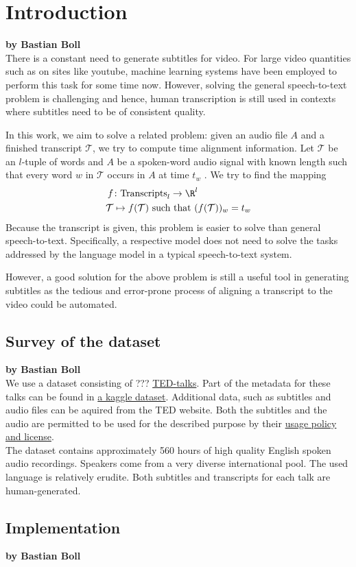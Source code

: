 \chapter{Introduction}
\label{chap:intro}

\textbf{by Bastian Boll} \\

There is a constant need to generate subtitles for video. For large video quantities such as on sites like youtube, machine learning systems have been employed to perform this task for some time now. However, solving the general speech-to-text problem is challenging and hence, human transcription is still used in contexts where subtitles need to be of consistent quality.

In this work, we aim to solve a related problem: given an audio file $A$ and a finished transcript $\mathcal{T}$, we try to compute time alignment information. Let $\mathcal{T}$ be an $l$-tuple of words and $A$ be a spoken-word audio signal with known length such that every word $w$ in $\mathcal{T}$ occurs in $A$ at time $t_w$ . We try to find the mapping
\begin{align*}
	f&\colon\textrm{Transcripts}_l\to\R^l\\
	\mathcal{T}&\mapsto f(\mathcal{T})\textrm{ such that }(f(\mathcal{T}))_w=t_w
\end{align*}
Because the transcript is given, this problem is easier to solve than general speech-to-text. Specifically, a respective model does not need to solve the tasks addressed by the language model in a typical speech-to-text system.

However, a good solution for the above problem is still a useful tool in generating subtitles as the tedious and error-prone process of aligning a transcript to the video could be automated.

\section{Survey of the dataset}

\textbf{by Bastian Boll} \\

We use a dataset consisting of ??? \href{https://www.ted.com}{TED-talks}. Part of the metadata for these talks can be found in \href{https://www.kaggle.com/rounakbanik/ted-talks}{a kaggle dataset}. Additional data, such as subtitles and audio files can be aquired from the TED website. Both the subtitles and the audio are permitted to be used for the described purpose by their \href{https://www.ted.com/about/our-organization/our-policies-terms/ted-talks-usage-policy}{usage policy and license}.\\
The dataset contains approximately 560 hours of high quality English spoken audio recordings. Speakers come from a very diverse international pool. The used language is relatively erudite. Both subtitles and transcripts for each talk are human-generated.

\section{Implementation}

\textbf{by Bastian Boll} \\

